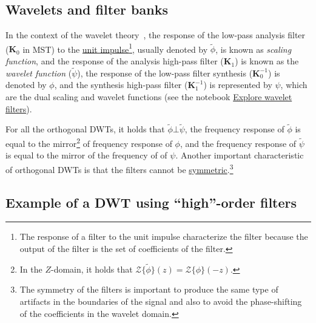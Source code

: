 
\subsection{Wavelets and filter banks}

In the context of the wavelet theory~\cite{burrus2013wavelets}, the
response of the low-pass analysis filter (${\mathbf K}_0$ in MST) to
the
\href{https://en.wikipedia.org/?title=Unit_impulse&redirect=no}{unit
  impulse}\footnote{The response of a filter to the unit impulse
characterize the filter because the output of the filter is the set of
coefficients of the filter.}, usually denoted by $\tilde\phi$, is
known as \emph{scaling function}, and the response of the analysis
high-pass filter (${\mathbf K}_1$) is known as the \emph{wavelet
function} ($\tilde\psi$), the response of
the low-pass filter synthesis (${\mathbf K}^{-1}_0$) is denoted by
$\phi$, and the synthesis high-pass filter (${\mathbf K}^{-1}_1$) is
represented by $\psi$, which are the dual scaling and wavelet
functions (see the notebook
\href{https://github.com/Tecnologias-multimedia/Tecnologias-multimedia.github.io/blob/master/contents/transform_coding/explore_wavelet_filters.ipynb}{Explore
  wavelet filters}).

For all the orthogonal DWTs, it holds that $\tilde\phi\bot\tilde\psi$,
the frequency response of $\tilde\phi$ is equal to the
mirror\footnote{In the $Z$-domain, it holds that
  ${\mathcal Z}\{\tilde\phi\}(z)={\mathcal Z}\{\phi\}(-z)$.} of
frequency response of $\phi$, and the frequency response of
$\tilde\psi$ is equal to the mirror of the frequency of of
$\psi$. Another important characteristic of orthogonal DWTs is that
the filters cannot be
\href{https://en.wikipedia.org/wiki/Symmetry}{symmetric}.\footnote{The
  symmetry of the filters is important to produce the same type of
  artifacts in the boundaries of the signal and also to avoid the
  phase-shifting of the coefficients in the wavelet domain.}



\subsection{Example of a DWT using ``high''-order filters}


